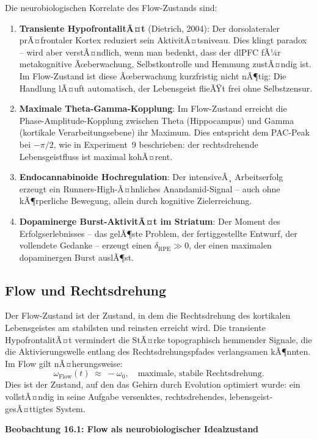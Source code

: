 ﻿\documentclass[12pt,a4paper]{report}
\theoremstyle{plain}
\theoremstyle{definition}
\theoremstyle{remark}
\begin{document}
	Die neurobiologischen Korrelate des Flow-Zustands sind:
	\begin{enumerate}[label=\arabic*., leftmargin=1.8cm]
		\item \textbf{Transiente HypofrontalitÃ¤t} (Dietrich, 2004):
		Der dorsolateraler prÃ¤frontaler Kortex reduziert sein AktivitÃ¤tsniveau.
		Dies klingt paradox -- wird aber verstÃ¤ndlich, wenn man bedenkt,
		dass der dlPFC fÃ¼r metakognitive Ãœberwachung, Selbstkontrolle
		und Hemmung zustÃ¤ndig ist. Im Flow-Zustand ist diese Ãœberwachung
		kurzfristig nicht nÃ¶tig: Die Handlung lÃ¤uft automatisch,
		der Lebensgeist flieÃŸt frei ohne Selbstzensur.
		\item \textbf{Maximale Theta-Gamma-Kopplung}: Im Flow-Zustand
		erreicht die Phase-Amplitude-Kopplung zwischen Theta (Hippocampus)
		und Gamma (kortikale Verarbeitungsebene) ihr Maximum.
		Dies entspricht dem PAC-Peak bei $-\pi/2$, wie in Experiment~9
		beschrieben: der rechtsdrehende Lebensgeistfluss ist maximal kohÃ¤rent.
		\item \textbf{Endocannabinoide Hochregulation}: Der intensiveÂ¸ Arbeitserfolg
		erzeugt ein Run\-ners-High-Ã¤hnliches Anandamid-Signal --
		auch ohne kÃ¶rperliche Bewegung, allein durch kognitive Zielerreichung.
		\item \textbf{Dopaminerge Burst-AktivitÃ¤t im Striatum}:
		Der Moment des Erfolgserlebnisses -- das gelÃ¶ste Problem,
		der fertiggestellte Entwurf, der vollendete Gedanke --
		erzeugt einen $\delta_{\mathrm{RPE}} \gg 0$, der einen maximalen
		dopaminergen Burst auslÃ¶st.
	\end{enumerate}

	\subsection{Flow und Rechtsdrehung}

	Der Flow-Zustand ist der Zustand, in dem die Rechtsdrehung
	des kortikalen Lebensgeistes am stabilsten und reinsten erreicht wird.
	Die transiente HypofrontalitÃ¤t vermindert die StÃ¤rke topographisch
	hemmender Signale, die die Aktivierungswelle entlang des
	Rechtsdrehungspfades verlangsamen kÃ¶nnten.
	Im Flow gilt nÃ¤herungsweise:
	\[
	\omega_{\mathrm{Flow}}(t) \;\approx\; -\omega_0,
	\quad \text{maximale, stabile Rechtsdrehung}.
	\]
	Dies ist der Zustand, auf den das Gehirn durch Evolution optimiert
	wurde: ein vollstÃ¤ndig in seine Aufgabe versenktes, rechtsdrehendes,
	lebensgeist-gesÃ¤ttigtes System.

	
	\noindent\textbf{Beobachtung 16.1: Flow als neurobiologischer Idealzustand}
\end{document}
